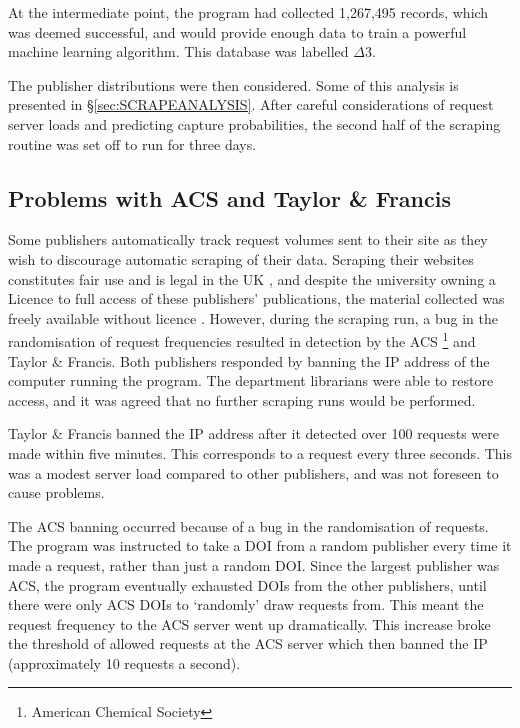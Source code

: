 At the intermediate point, the program had collected 1,267,495 records, which was deemed successful, and would provide enough data to train a powerful machine learning algorithm. This database was labelled $\Delta3$.

The publisher distributions were then considered. Some of this analysis is presented in \S\ref{sec:SCRAPEANALYSIS}. After careful considerations of request server loads and predicting capture probabilities, the second half of the scraping routine was set off to run for three days.
\label{sec:CROSSREFSCRAPE}
\subsection{Problems with ACS and Taylor \& Francis}
Some publishers automatically track request volumes sent to their site as they wish to discourage automatic scraping of their data. Scraping their websites constitutes fair use and is legal in the UK , and despite the university owning a Licence to full access of these publishers' publications, the material collected was freely available without licence\cite{thelaw} \cite{contentminelegal}. However, during the scraping run, a bug in the randomisation of request frequencies resulted in detection by the ACS \footnote{American Chemical Society} and Taylor \& Francis. Both publishers responded by banning the IP address of the computer running the program. The department librarians were able to restore access, and it was agreed that no further scraping runs would be performed. 

Taylor \& Francis banned the IP address after it detected over 100 requests were made within five minutes. This corresponds to a request every three seconds. This was a modest server load compared to other publishers, and was not foreseen to cause problems.

The ACS banning occurred because of a bug in the randomisation of requests. The program was instructed to take a DOI from a random publisher every time it made a request, rather than just a random DOI. Since the largest publisher was ACS, the program eventually exhausted DOIs from the other publishers, until there were only ACS DOIs to `randomly' draw requests from. This meant the request frequency to the ACS server went up dramatically. This increase broke the threshold of allowed requests at the ACS server which then banned the IP (approximately 10 requests a second).

